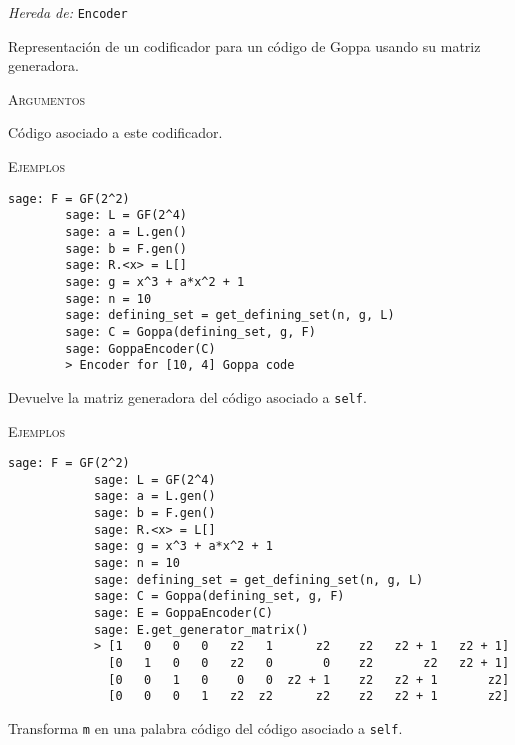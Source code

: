\begin{description}[leftmargin=1em, font=\normalfont\ttfamily, style=nextline]
    \item[class GoppaEncoder(self, code)]
    
    \emph{Hereda de:} \texttt{Encoder}
  
    Representación de un codificador para un código de Goppa usando su matriz generadora.
  
    \textsc{Argumentos}
    \begin{description}[font=\normalfont\ttfamily]
        \item[code] Código asociado a este codificador.
    \end{description}

    \textsc{Ejemplos}
    \begin{lstlisting}[gobble=4]
        sage: F = GF(2^2)
        sage: L = GF(2^4)
        sage: a = L.gen()
        sage: b = F.gen()
        sage: R.<x> = L[]
        sage: g = x^3 + a*x^2 + 1
        sage: n = 10
        sage: defining_set = get_defining_set(n, g, L)
        sage: C = Goppa(defining_set, g, F)
        sage: GoppaEncoder(C)
        > Encoder for [10, 4] Goppa code
    \end{lstlisting}

    \begin{description}[font=\ttfamily, style=nextline]
        \item[get\_generator\_matrix(self)] Devuelve la matriz generadora del código asociado a \texttt{self}.

        \textsc{Ejemplos}
        \begin{lstlisting}[gobble=4]
            sage: F = GF(2^2)
            sage: L = GF(2^4)
            sage: a = L.gen()
            sage: b = F.gen()
            sage: R.<x> = L[]
            sage: g = x^3 + a*x^2 + 1
            sage: n = 10
            sage: defining_set = get_defining_set(n, g, L)
            sage: C = Goppa(defining_set, g, F)
            sage: E = GoppaEncoder(C)
            sage: E.get_generator_matrix()
            > [1   0   0   0   z2   1      z2    z2   z2 + 1   z2 + 1]
              [0   1   0   0   z2   0       0    z2       z2   z2 + 1]
              [0   0   1   0    0   0  z2 + 1    z2   z2 + 1       z2]
              [0   0   0   1   z2  z2      z2    z2   z2 + 1       z2]
        \end{lstlisting}

        \item[encode(self, m)] Transforma \texttt{m} en una palabra código del código asociado a \texttt{self}.


\end{description}
\end{description}
